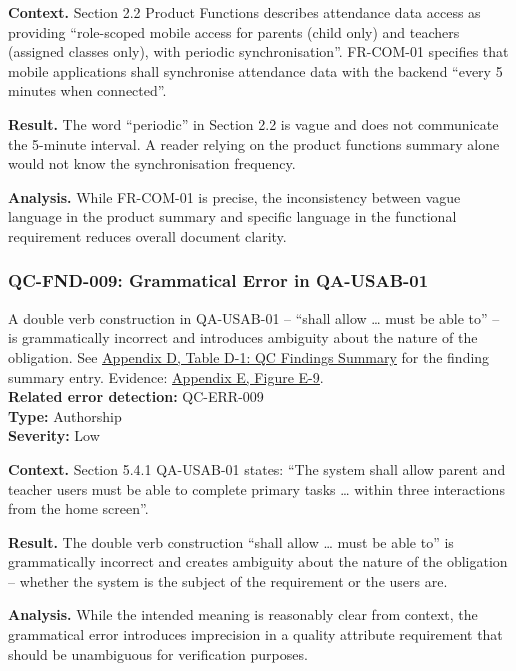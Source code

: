 \documentclass[11pt,a4paper]{article}
\let\orighyperref\hyperref
\renewcommand{\hyperref}[2][]{\orighyperref[#1]{\uline{#2}}}
\begin{document}
\textbf{Context.} Section 2.2 Product Functions describes attendance data access as providing ``role-scoped mobile access for parents (child only) and teachers (assigned classes only), with periodic synchronisation''. FR-COM-01 specifies that mobile applications shall synchronise attendance data with the backend ``every 5 minutes when connected''.

\textbf{Result.} The word ``periodic'' in Section 2.2 is vague and does not communicate the 5-minute interval. A reader relying on the product functions summary alone would not know the synchronisation frequency.

\textbf{Analysis.} While FR-COM-01 is precise, the inconsistency between vague language in the product summary and specific language in the functional requirement reduces overall document clarity.

\subsubsection*{QC-FND-009: Grammatical Error in QA-USAB-01}
A double verb construction in QA-USAB-01 -- ``shall allow \ldots{} must be able to'' -- is grammatically incorrect and introduces ambiguity about the nature of the obligation. See \hyperref[tab:qc-findings-summary]{Appendix D, Table D-1: QC Findings Summary} for the finding summary entry. Evidence: \hyperref[fig:evidence-009]{Appendix E, Figure E-9}. \\
\textbf{Related error detection:} QC-ERR-009 \\
\textbf{Type:} Authorship \\
\textbf{Severity:} Low

\textbf{Context.} Section 5.4.1 QA-USAB-01 states: ``The system shall allow parent and teacher users must be able to complete primary tasks \ldots{} within three interactions from the home screen''.

\textbf{Result.} The double verb construction ``shall allow \ldots{} must be able to'' is grammatically incorrect and creates ambiguity about the nature of the obligation -- whether the system is the subject of the requirement or the users are.

\textbf{Analysis.} While the intended meaning is reasonably clear from context, the grammatical error introduces imprecision in a quality attribute requirement that should be unambiguous for verification purposes.
\end{document}
